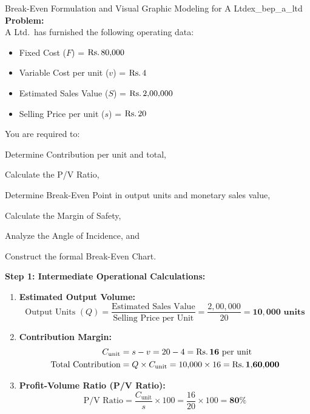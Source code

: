 \newpage
{}
\begin{example}{Break-Even Formulation and Visual Graphic Modeling for A Ltd}{ex_bep_a_ltd}
\textbf{Problem:} \\
A Ltd.~has furnished the following operating data:
\begin{itemize}[noitemsep]
    \item Fixed Cost ($F$) = $\text{Rs.}\, 80{,}000$
    \item Variable Cost per unit ($v$) = $\text{Rs.}\, 4$
    \item Estimated Sales Value ($S$) = $\text{Rs.}\, 2{,}00{,}000$
    \item Selling Price per unit ($s$) = $\text{Rs.}\, 20$
\end{itemize}
You are required to:
\begin{enumerate*}[label=(\alph*), itemjoin=\quad]
    \item Determine Contribution per unit and total,
    \item Calculate the P/V Ratio,
    \item Determine Break-Even Point in output units and monetary sales value,
    \item Calculate the Margin of Safety,
    \item Analyze the Angle of Incidence, and
    \item Construct the formal Break-Even Chart.
\end{enumerate*}

\tcbline
\textbf{Step 1: Intermediate Operational Calculations:}
\begin{enumerate}[leftmargin=*]
    \item \textbf{Estimated Output Volume:}
    \begin{equation*}
        \text{Output Units } (Q) = \frac{\text{Estimated Sales Value}}{\text{Selling Price per Unit}} = \frac{2{,}00{,}000}{20} = \mathbf{10{,}000 \text{ units}}
    \end{equation*}

    \item \textbf{Contribution Margin:}
    \begin{align*}
        C_{\text{unit}} &= s - v = 20 - 4 = \mathbf{\text{Rs.}\, 16 \text{ per unit}} \\
        \text{Total Contribution} &= Q \times C_{\text{unit}} = 10{,}000 \times 16 = \mathbf{\text{Rs.}\, 1{,}60{,}000}
    \end{align*}

    \item \textbf{Profit-Volume Ratio (P/V Ratio):}
    \begin{equation*}
        \text{P/V Ratio} = \frac{C_{\text{unit}}}{s} \times 100 = \frac{16}{20} \times 100 = \mathbf{80\%}
    \end{equation*}


\end{enumerate}
\end{example}
